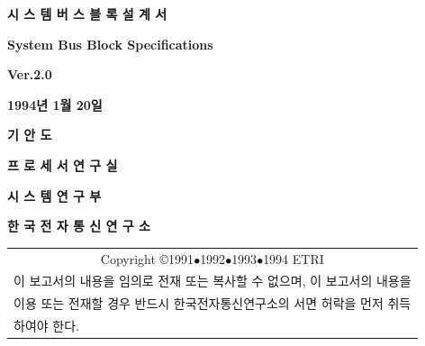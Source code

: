 \documentclass[12pt]{book}
\begin{document}
\begin{titlepage}
\begin{center}{\LARGE\bf 시 스 템 버 스 블 록 설 계 서}\end{center}
\vspace{10mm}
\begin{center}{\Large\bf System Bus Block Specifications}\end{center}
\vspace{15mm}
\begin{center}{\Large\bf Ver.2.0}\end{center}
\vspace{15mm}
\begin{center}{\Large\bf 1994년 1월 20일}\end{center}
\vspace{15mm}
\begin{center}{\Large\bf 기 안 도}\end{center}
\vspace{15mm}
\begin{center}{\Large\bf 프 로 세 서 연 구 실}\end{center}
\begin{center}{\Large\bf 시 스 템 연 구 부}\end{center}
\begin{center}{\Large\bf 한 국 전 자 통 신 연 구 소}\end{center}
\begin{table}[b]
   \begin{center}
     \begin{tabular}{|l|} \hline
	\multicolumn{1}{|c|}{Copyright \copyright 1991$\bullet$1992$\bullet$1993$\bullet$1994 ETRI} \\
	이 보고서의 내용을 임의로 전재 또는 복사할 수 없으며, 이 보고서의 내용을 \\
	이용 또는 전재할 경우 반드시 한국전자통신연구소의 서면 허락을 먼저 취득 \\
	하여야 한다. \\ \hline
     \end{tabular}
   \end{center}
\end{table}
\thispagestyle{empty}
\end{titlepage}
%

\clearpage
{}
\tableofcontents
{}
\newpage
\listoffigures
{}
\newpage
\listoftables
{}
%
\newpage
\end{document}
